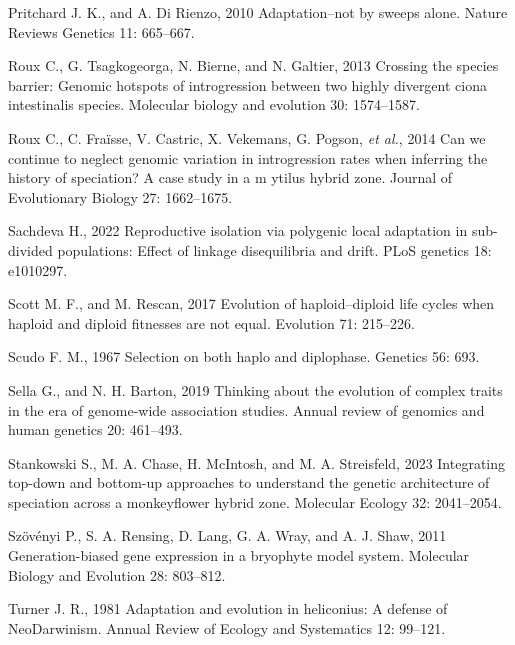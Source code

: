 \documentclass[
  11pt,
]{article}
\newlength{\cslhangindent}
\newlength{\cslentryspacingunit} %
\newenvironment{CSLReferences}[2] %
 {%
  \setlength{\parindent}{0pt}
  \ifodd #1
  \let\oldpar\par
  \def\par{\hangindent=\cslhangindent\oldpar}
  \fi
  \setlength{\parskip}{#2\cslentryspacingunit}
 }%
 {}
\begin{document}
\begin{CSLReferences}{1}{0}
\leavevmode{}%
Pritchard J. K., and A. Di Rienzo, 2010 Adaptation--not by sweeps alone.
Nature Reviews Genetics 11: 665--667.

\leavevmode{}%
Roux C., G. Tsagkogeorga, N. Bierne, and N. Galtier, 2013 Crossing the
species barrier: Genomic hotspots of introgression between two highly
divergent ciona intestinalis species. Molecular biology and evolution
30: 1574--1587.

\leavevmode{}%
Roux C., C. Fraïsse, V. Castric, X. Vekemans, G. Pogson, \emph{et al.},
2014 Can we continue to neglect genomic variation in introgression rates
when inferring the history of speciation? A case study in a m ytilus
hybrid zone. Journal of Evolutionary Biology 27: 1662--1675.

\leavevmode{}%
Sachdeva H., 2022 Reproductive isolation via polygenic local adaptation
in sub-divided populations: Effect of linkage disequilibria and drift.
PLoS genetics 18: e1010297.

\leavevmode{}%
Scott M. F., and M. Rescan, 2017 Evolution of haploid--diploid life
cycles when haploid and diploid fitnesses are not equal. Evolution 71:
215--226.

\leavevmode{}%
Scudo F. M., 1967 Selection on both haplo and diplophase. Genetics 56:
693.

\leavevmode{}%
Sella G., and N. H. Barton, 2019 Thinking about the evolution of complex
traits in the era of genome-wide association studies. Annual review of
genomics and human genetics 20: 461--493.

\leavevmode{}%
Stankowski S., M. A. Chase, H. McIntosh, and M. A. Streisfeld, 2023
Integrating top-down and bottom-up approaches to understand the genetic
architecture of speciation across a monkeyflower hybrid zone. Molecular
Ecology 32: 2041--2054.

\leavevmode{}%
Szövényi P., S. A. Rensing, D. Lang, G. A. Wray, and A. J. Shaw, 2011
Generation-biased gene expression in a bryophyte model system. Molecular
Biology and Evolution 28: 803--812.

\leavevmode{}%
Turner J. R., 1981 Adaptation and evolution in heliconius: A defense of
NeoDarwinism. Annual Review of Ecology and Systematics 12: 99--121.


\end{CSLReferences}
\end{document}
